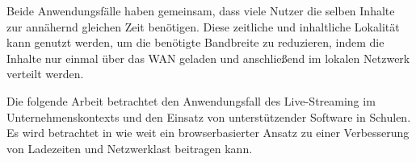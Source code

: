 Beide Anwendungsfälle haben gemeinsam, dass viele Nutzer die selben Inhalte zur annähernd gleichen Zeit benötigen. Diese zeitliche und inhaltliche Lokalität kann genutzt werden, um die benötigte Bandbreite zu reduzieren, indem die Inhalte nur einmal über das WAN geladen und anschließend im lokalen Netzwerk verteilt werden.

Die folgende Arbeit betrachtet den Anwendungsfall des Live-Stream\-ing im Unternehmenskontexts und den Einsatz von unterstützender Software in Schulen. Es wird betrachtet in wie weit ein browserbasierter \pTp Ansatz zu einer Verbesserung von Ladezeiten und Netzwerklast beitragen kann.



\section{\schulCloud}

